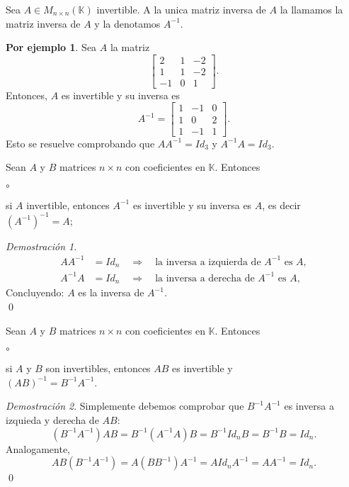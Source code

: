 \documentclass{article}
\theoremstyle{definition}
\theoremstyle{definition}
\newtheorem*{ej}{Por ejemplo}
\theoremstyle{remark}
\newtheorem*{demo}{Demostración}
\begin{document}
\begin{defi}
  Sea $A \in M_{n \times n}(\mathbb{K})$ invertible. A la unica matriz inversa de $A$ la llamamos la matriz inversa de $A$ y la denotamos $A^{-1}$.
\end{defi}
\begin{ej}
  Sea $A$ la matriz \[    \begin{bmatrix}2 & 1 & -2 \\ 1 & 1 & -2 \\ -1 & 0 & 1 \end{bmatrix} .
  \] Entonces, $A$ es invertible y su inversa es \[
    A^{-1}=\begin{bmatrix}1 & -1 & 0 \\ 1 & 0 & 2 \\ 1 & -1 & 1 \end{bmatrix}.
  \]Esto se resuelve comprobando que $AA^{-1}=Id_3$ y $A^{-1}A=Id_3$.
\end{ej}
\begin{teo}
  Sean $A$ y $B$ matrices $n \times n$ con coeficientes en $\mathbb{K}$. Entonces \begin{list}{$\circ$}{}  
  \item si $A$ invertible, entonces $A^{-1}$ es invertible y su inversa es $A$, es decir $(A^{-1})^{-1}=A$;
\end{list}
\end{teo}
\begin{demo}
  \[\begin{aligned}
    AA^{-1}&=Id_n \quad \Rightarrow \quad \text{la inversa a izquierda de }A^{-1} \text{ es }A,\\
    A^{-1}A&=Id_n \quad \Rightarrow \quad \text{la inversa a derecha de }A^{-1} \text{ es } A,
  \end{aligned}
  \]
Concluyendo: $A$ es la inversa de $A^{-1}$.\\
\qed
\end{demo}
\begin{teo}
  Sean $A$ y $B$ matrices $n \times n$ con coeficientes en $\mathbb{K}$. Entonces \begin{list}{$\circ$}{}  
  \item si $A$ y $B$ son invertibles, entonces $AB$ es invertible y\\ $(AB)^{-1}=B^{-1}A^{-1}$.
\end{list}
\end{teo}
\begin{demo}
  Simplemente debemos comprobar que $B^{-1}A^{-1}$ es inversa a izquieda y derecha de $AB$: \[
    (B^{-1}A^{-1})AB=B^{-1}(A^{-1}A)B=B^{-1}Id_nB=B^{-1}B=Id_n.
  \]
  Analogamente, \[
    AB(B^{-1}A^{-1})=A(BB^{-1})A^{-1}=AId_nA^{-1}=AA^{-1}=Id_n.
  \]
  \qed
\end{demo}
\end{document}

